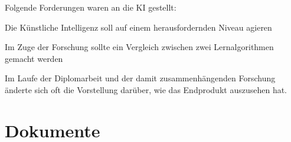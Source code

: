 Folgende Forderungen waren an die KI gestellt:
\begin{compactitem}
    \item Die Künstliche Intelligenz soll auf einem herausfordernden Niveau agieren
    \item Im Zuge der Forschung sollte ein Vergleich zwischen zwei Lernalgorithmen gemacht werden
\end{compactitem}


Im Laufe der Diplomarbeit und der damit zusammenhängenden Forschung änderte sich oft die
Vorstellung darüber, wie das Endprodukt auszusehen hat.


\section{Dokumente}
